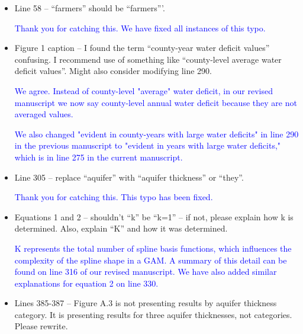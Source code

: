 \documentclass[
]{article}
\begin{document}
\begin{itemize}
    \item Line 58 – ``farmers'' should be ``farmers'''.

\textcolor{blue}{Thank you for catching this. We have fixed all instances of this typo.}

\item Figure 1 caption – I found the term ``county-year water deficit values'' confusing. I recommend use of something like ``county-level average water deficit values''. Might also consider modifying line 290.

\textcolor{blue}{We agree. Instead of county-level "average" water deficit, in our revised manuscript we now say county-level annual water deficit because they are not averaged values.}

\textcolor{blue}{We also changed "evident in county-years with large water deficits" in line 290 in the previous manuscript to "evident in years with large water deficits," which is in line 275 in the current manuscript.}

\item Line 305 – replace ``aquifer'' with ``aquifer thickness'' or ``they''.

\textcolor{blue}{Thank you for catching this. This typo has been fixed.}

\item Equations 1 and 2 – shouldn't ``k'' be ``k=1'' – if not, please explain how k is determined. Also, explain ``K'' and how it was determined.

\textcolor{blue}{K represents the total number of spline basis functions, which influences the complexity of the spline shape in a GAM. A summary of this detail can be found on line 316 of our revised manuscript. We have also added similar explanations for equation 2 on line 330.}

\item Lines 385-387 – Figure A.3 is not presenting results by aquifer thickness category. It is presenting results for three aquifer thicknesses, not categories. Please rewrite.


\end{itemize}
\end{document}
